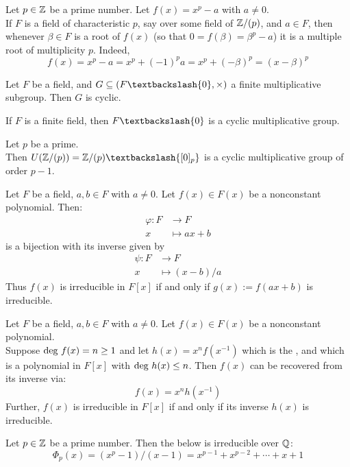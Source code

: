 \begin{remark}
Let $p \in \mathbb{Z}$ be a prime number. Let $f(x) = x^p - a$ with $a \neq 0$.\\
If $F$ is a field of characteristic $p$, say over some field of $\mathbb{Z} /(p)$, and $a \in F$, then whenever $\beta \in F$ is a root of $f(x)$ (so that $0=f(\beta) = \beta^p - a$) it is a multiple root of multiplicity $p$. Indeed,
\begin{equation}
f(x) = x^p - a = x^p + (-1)^p a = x^p + (-\beta)^p = (x-\beta)^p \nonumber
\end{equation}
\end{remark}

\begin{proposition}
Let $F$ be a field, and $G \subseteq (F \textbackslash \{0\}, \times)$ a finite multiplicative subgroup. Then $G$ is cyclic.
\end{proposition}

\begin{proposition}
If $F$ is a finite field, then $F\textbackslash \{0\}$ is a cyclic multiplicative group.
\end{proposition}

\begin{corollary}
Let $p$ be a prime.\\
Then $U(\Z /(p)) = \Z/(p) \textbackslash \{[0]_p\}$ is a cyclic multiplicative group of order $p-1$.
\end{corollary}

\begin{remark}
Let $F$ be a field, $a,b \in F$ with $a \neq 0$. Let $f(x) \in F(x)$ be a nonconstant polynomial. Then:\\
\begin{align}
\varphi: F &\rightarrow F \nonumber \\
x &\mapsto ax + b \nonumber
\end{align}
is a bijection with its inverse given by
\begin{align}
\psi: F &\rightarrow F \nonumber \\
x &\mapsto (x-b)/a \nonumber
\end{align}
Thus $f(x)$ is irreducible in $F[x]$ if and only if $g(x) := f(ax+b)$ is irreducible.
\end{remark}

\begin{remark}
Let $F$ be a field, $a,b \in F$ with $a \neq 0$. Let $f(x) \in F(x)$ be a nonconstant polynomial.\\
Suppose $\textnormal{deg}\ f(x) = n \geq 1$ and let $h(x) = x^n f(x^{-1})$ which is the , and which is a polynomial in $F[x]$ with $\textnormal{deg}\ h(x) \leq n$. Then $f(x)$ can be recovered from its inverse via:
\begin{equation}
f(x) = x^n h(x^{-1}) \nonumber
\end{equation}
Further, $f(x)$ is irreducible in $F[x]$ if and only if its inverse $h(x)$ is irreducible.
\end{remark}

\begin{example}
Let $p \in \mathbb{Z}$ be a prime number. Then the  below is irreducible over $\mathbb{Q}$:
\begin{equation}
\Phi_p (x) = (x^p - 1)/(x-1) = x^{p-1} + x^{p-2} + \cdots + x + 1 \nonumber
\end{equation}
\end{example}
